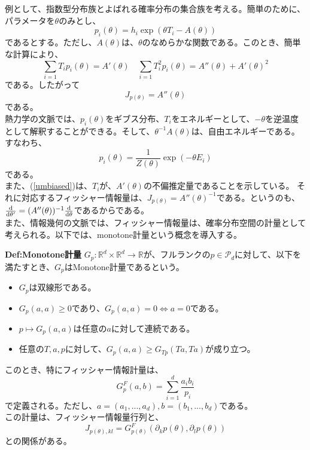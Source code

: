 \documentclass[a4paper,11pt]{jsarticle}
\numberwithin{equation}{section}
\begin{document}
例として、指数型分布族とよばれる確率分布の集合族を考える。簡単のために、パラメータを$\theta$のみとし、
\begin{equation}
    p_i(\theta) = h_i\exp(\theta T_i - A(\theta))
\end{equation}
であるとする。ただし、$A(\theta)$は、$\theta$のなめらかな関数である。このとき、簡単な計算により、
\begin{equation}
    \sum_{i=1} T_i p_i(\theta) = A'(\theta) \quad \sum_{i=1} T_i^2 p_i(\theta) = A''(\theta)+A'(\theta)^2
\end{equation}
である。したがって%
\begin{equation}
    J_{p(\theta)} = A''(\theta)
\end{equation}
である。\\
熱力学の文脈では、$p_i(\theta)$をギブス分布、$T_i$をエネルギーとして、$-\theta$を逆温度として解釈することができる。そして、$\theta ^{-1}A(\theta)$は、自由エネルギーである。すなわち、
\begin{equation}
    p_i(\theta) = \frac{1}{Z(\theta)}\exp(-\theta E_i)
\end{equation}
である。\\
また、(\ref{umbiased})は、$T_i$が、$A'(\theta)$の不偏推定量であることを示している。
それに対応するフィッシャー情報量は、$J_{p(\theta)} = A''(\theta)^{-1}$である。というのも、$\dv{\theta'}=(A''(\theta))^{-1}\dv{\theta}$であるからである。\\


また、情報幾何の文脈では、フィッシャー情報量は、確率分布空間の計量として考えられる。以下では、monotone計量という概念を導入する。\\
\begin{itembox}[l]{\textbf{Def:Monotone計量}}
    $G_p: \mathbb{R}^d \times \mathbb{R}^d \to \mathbb{R}$が、フルランクの$p \in \mathcal{P}_d$に対して、以下を満たすとき、$G_p$はMonotone計量であるという。
    \begin{itemize}
        \item $G_p$は双線形である。
        \item $G_p(a,a)\geq 0$であり、$G_p(a,a) = 0 \Leftrightarrow a = 0$である。
        \item $p \mapsto G_p(a,a)$は任意の$a$に対して連続である。
        \item 任意の$T,a,p$に対して、$G_{p}(a,a) \geq G_{Tp}(Ta,Ta)$が成り立つ。
    \end{itemize}
\end{itembox}
このとき、特にフィッシャー情報計量は、
\begin{equation}
    \label{umbiased}
    G_p^F (a,b) = \sum_{i=1}^{d}\frac{a_i b_i}{p_i}
\end{equation}
で定義される。ただし、$a=(a_1,...,a_d), b=(b_1,...,b_d)$である。\\
この計量は、フィッシャー情報量行列と、
\begin{equation}
    J_{p(\theta),kl} = G_{p(\theta)}^F (\partial_k p(\theta), \partial_l p(\theta))
\end{equation}
との関係がある。\\
\end{document}
